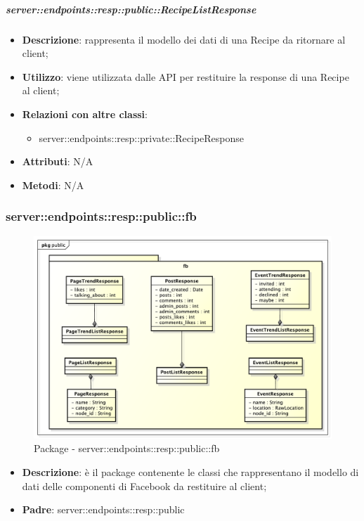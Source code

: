     \subparagraph{server::endpoints::resp::public::RecipeListResponse} %
    \label{subp:bdsm_app_server_endpoints_resp_private_recipelistresponse}
    \begin{itemize}
      \item \textbf{Descrizione}: rappresenta il modello dei dati di una Recipe da ritornare al client;
      \item \textbf{Utilizzo}: viene utilizzata dalle API per restituire la response di una Recipe al client;
      \item \textbf{Relazioni con altre classi}:
        \begin{itemize}
          \item server::endpoints::resp::private::RecipeResponse
        \end{itemize}
    \item \textbf{Attributi}: N/A
    \item \textbf{Metodi}: N/A
      \end{itemize}

\subsubsection{server::endpoints::resp::public::fb} %
\label{ssub:bdsm_app_server_endpoints_resp_public_fb}
\begin{figure}[!htbp]
	\centering
	\centerline{\includegraphics[scale=0.55]{./images/server/resp_fb.pdf}}
	\caption{Package - server::endpoints::resp::public::fb}
\end{figure}

\begin{itemize}
  \item \textbf{Descrizione}: è il package contenente le classi che rappresentano il modello di dati delle componenti di Facebook da restituire al client;
  \item \textbf{Padre}: server::endpoints::resp::public
\end{itemize}

